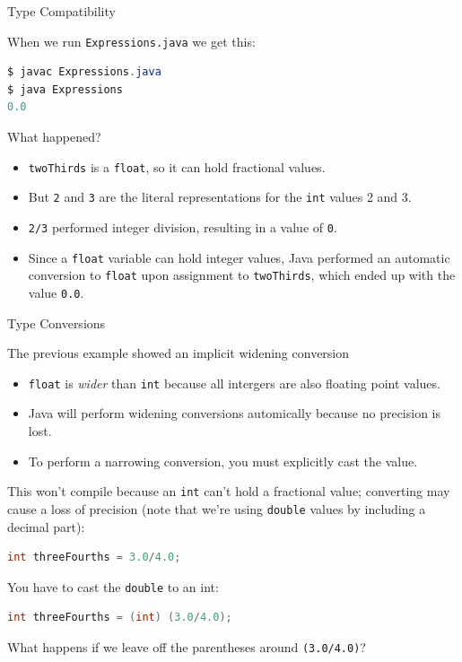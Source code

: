 \documentclass{beamer}
\begin{document}
\begin{frame}[fragile]{Type Compatibility}


When we run {\tt Expressions.java} we get this:
\begin{lstlisting}[language=Java]
$ javac Expressions.java
$ java Expressions
0.0
\end{lstlisting}

What happened?

\begin{itemize}
\item {\tt twoThirds} is a {\tt float}, so it can hold fractional values.
\item But {\tt 2} and {\tt 3} are the literal representations for the {\tt int} values 2 and 3.
\item {\tt 2/3} performed integer division, resulting in a value of {\tt 0}.
\item Since a {\tt float} variable can hold integer values, Java performed an automatic conversion to {\tt float} upon assignment to {\tt twoThirds}, which ended up with the value {\tt 0.0}.
\end{itemize}


\end{frame}

\begin{frame}[fragile]{Type Conversions}


The previous example showed an implicit widening conversion
\begin{itemize}
\item {\tt float} is {\it wider} than {\tt int} because all intergers are also floating point values.
\item Java will perform widening conversions automically because no precision is lost.
\item To perform a narrowing conversion, you must explicitly cast the value.
\end{itemize}

This won't compile because an {\tt int} can't hold a fractional value; converting may cause a loss of precision (note that we're using {\tt double} values by including a decimal part):
\begin{lstlisting}[language=Java]
int threeFourths = 3.0/4.0;
\end{lstlisting}

You have to cast the {\tt double} to an int:

\begin{lstlisting}[language=Java]
int threeFourths = (int) (3.0/4.0);
\end{lstlisting}

What happens if we leave off the parentheses around {\tt (3.0/4.0)}?


\end{frame}
\end{document}
